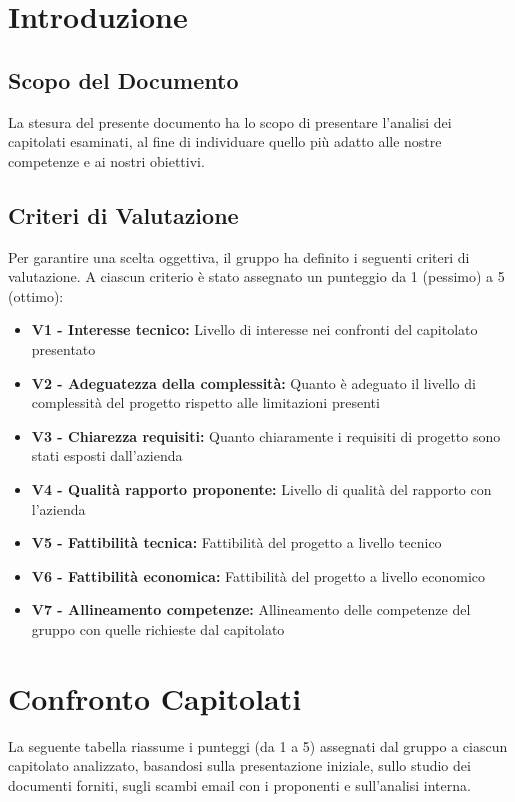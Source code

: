 \section{Introduzione}

\subsection{Scopo del Documento}
La stesura del presente documento ha lo scopo di presentare l'analisi dei capitolati esaminati, al fine di individuare quello più adatto alle nostre competenze e ai nostri obiettivi.

\subsection{Criteri di Valutazione}
Per garantire una scelta oggettiva, il gruppo ha definito i seguenti criteri di valutazione. A ciascun criterio è stato assegnato un punteggio da 1 (pessimo) a 5 (ottimo):
\begin{itemize}
	\item \textbf{V1 - Interesse tecnico:} {Livello di interesse nei confronti del capitolato presentato}
	\item \textbf{V2 - Adeguatezza della complessità:} {Quanto è adeguato il livello di complessità del progetto rispetto alle limitazioni presenti}
	\item \textbf{V3 - Chiarezza requisiti:} {Quanto chiaramente i requisiti di progetto sono stati esposti dall'azienda}
	\item \textbf{V4 - Qualità rapporto proponente:} {Livello di qualità del rapporto con l'azienda}
	\item \textbf{V5 - Fattibilità tecnica:} {Fattibilità del progetto a livello tecnico}
	\item \textbf{V6 - Fattibilità economica:} {Fattibilità del progetto a livello economico}
	\item \textbf{V7 - Allineamento competenze:} {Allineamento delle competenze del gruppo con quelle richieste dal capitolato}
\end{itemize}

\newpage
\section{Confronto Capitolati}
La seguente tabella riassume i punteggi (da 1 a 5) assegnati dal gruppo a ciascun capitolato analizzato, basandosi sulla presentazione iniziale, sullo studio dei documenti forniti, sugli scambi email con i proponenti e sull'analisi interna.

